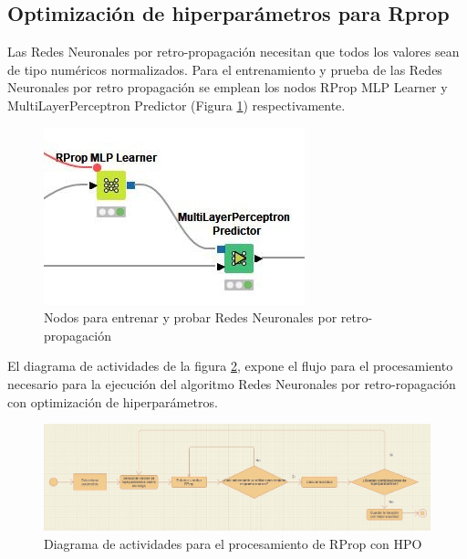 \subsection{Optimización de hiperparámetros para Rprop}
Las Redes Neuronales por retro-propagación necesitan que todos los valores sean de tipo numéricos normalizados. Para el entrenamiento y prueba de las Redes Neuronales por retro propagación se emplean los nodos RProp MLP Learner y MultiLayerPerceptron Predictor (Figura \ref{fig:nodos-rprop}) respectivamente.

\begin{figure}[H]
	\centering
	\includegraphics[width=0.4\linewidth]{"figuras/capi 2/nodos-rprop"}
	\caption[Nodos para entrenar y probar Redes Neuronales por retro propagación]{Nodos para entrenar y probar Redes Neuronales por retro-propagación}
	\label{fig:nodos-rprop}
\end{figure}

El diagrama de actividades de la figura \ref{fig:diagrama-act-proc-rprop-hpo}, expone el flujo para el procesamiento necesario para la ejecución del algoritmo Redes Neuronales por retro-ropagación con optimización de hiperparámetros.
\begin{figure}[H]
	\centering
	\includegraphics[width=0.7\linewidth]{"figuras/capi 2/diagrama-act-proc-rprop-hpo"}
	\caption[Diagrama de actividades para el procesamiento de RProp con HPO]{Diagrama de actividades para el procesamiento de RProp con HPO}
	\label{fig:diagrama-act-proc-rprop-hpo}
\end{figure}

